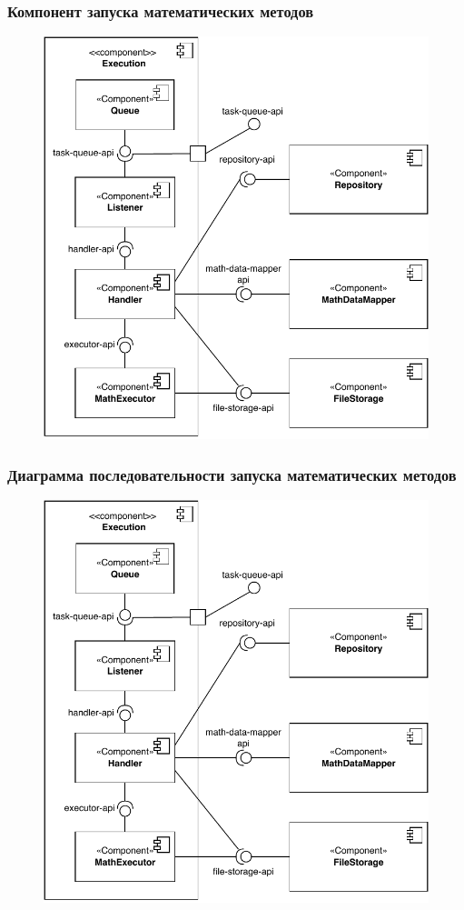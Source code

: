 \begin{frame}
\frametitle{Компонент запуска математических методов}
\begin{figure}
    \includegraphics[scale=.5]{pictures/architecture/executor_component_detailed}
\end{figure}
\end{frame}

\begin{frame}
\frametitle{Диаграмма последовательности запуска математических методов}
\begin{figure}
    \includegraphics[scale=.5]{pictures/architecture/executor_component_detailed}
\end{figure}
\end{frame}


